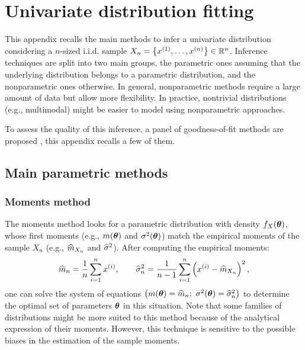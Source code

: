 \cleardoublepage
\chapter{Univariate distribution fitting}
\label{apx:A}

This appendix recalls the main methods to infer a univariate distribution considering a $n$-sized i.i.d. sample $X_n = \left\{x^{(1)}, \dots, x^{(n)}\right\} \in \mathbb{R}^{n}$. 
Inference techniques are split into two main groups, the parametric ones assuming that the underlying distribution belongs to a parametric distribution, and the nonparametric ones otherwise. 
In general, nonparametric methods require a large amount of data but allow more flexibility. 
In practice, nontrivial distributions (e.g., multimodal) might be easier to model using nonparametric approaches.

To assess the quality of this inference, a panel of goodness-of-fit methods are proposed \citep{saporta_2006}, this appendix recalls a few of them. 

\section*{Main parametric methods}

\subsection*{Moments method}
The moments method looks for a parametric distribution with density $f_X({\boldsymbol{\theta}})$, whose first moments (e.g., $m({\boldsymbol{\theta}})$ and $\sigma^2({\boldsymbol{\theta}})$) match 
the empirical moments of the sample $X_n$ (e.g., $\widehat{m}_{X_n}$ and $\widehat{\sigma}^2$). After computing the empirical moments: 
\begin{equation}
    \widehat{m}_{n} = \frac1n \sum_{i=1}^{n} x^{(i)}, \qquad \widehat{\sigma}^2_n = \frac{1}{n-1} \sum_{i=1}^{n} \left(x^{(i)} - \widehat{m}_{X_n}\right)^2,
\end{equation} 
one can solve the system of equations $\left(m(\btheta) = \what{m}_{n}; \ \sigma^2(\btheta) = \what{\sigma}_n^2\right)$ to determine the optimal set of parameters ${\boldsymbol{\theta}}$ in this situation. 
Note that some families of distributions might be more suited to this method because of the analytical expression of their moments. 
However, this technique is sensitive to the possible biases in the estimation of the sample moments.

